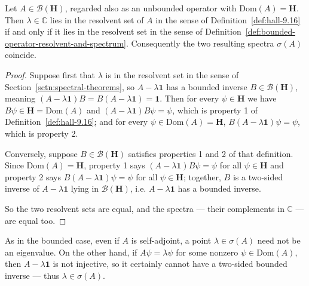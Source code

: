 \begin{lemma}
    \label{lmm:spectrum-notions-agree}
    \leanok
    Let $A \in \mathcal{B}(\mathbf{H})$, regarded also as an unbounded operator with $\text{Dom}(A) = \mathbf{H}$. Then $\lambda \in \mathbb{C}$ lies in the resolvent set of $A$ in the sense of Definition~\ref{def:hall-9.16} if and only if it lies in the resolvent set in the sense of Definition~\ref{def:bounded-operator-resolvent-and-spectrum}. Consequently the two resulting spectra $\sigma(A)$ coincide.
\end{lemma}
\begin{proof}
    \leanok
Suppose first that $\lambda$ is in the resolvent set in the sense of Section~\ref{sctn:spectral-theorems}, so $A - \lambda\mathbf{1}$ has a bounded inverse $B \in \mathcal{B}(\mathbf{H})$, meaning $(A-\lambda\mathbf{1})B = B(A-\lambda\mathbf{1}) = \mathbf{1}$. Then for every $\psi \in \mathbf{H}$ we have $B\psi \in \mathbf{H} = \text{Dom}(A)$ and $(A-\lambda\mathbf{1})B\psi = \psi$, which is property 1 of Definition~\ref{def:hall-9.16}; and for every $\psi \in \text{Dom}(A) = \mathbf{H}$, $B(A-\lambda\mathbf{1})\psi = \psi$, which is property 2.

Conversely, suppose $B \in \mathcal{B}(\mathbf{H})$ satisfies properties 1 and 2 of that definition. Since $\text{Dom}(A) = \mathbf{H}$, property 1 says $(A-\lambda\mathbf{1})B\psi = \psi$ for all $\psi \in \mathbf{H}$ and property 2 says $B(A-\lambda\mathbf{1})\psi = \psi$ for all $\psi \in \mathbf{H}$; together, $B$ is a two-sided inverse of $A - \lambda\mathbf{1}$ lying in $\mathcal{B}(\mathbf{H})$, i.e. $A - \lambda\mathbf{1}$ has a bounded inverse.

So the two resolvent sets are equal, and the spectra — their complements in $\mathbb{C}$ — are equal too.
\end{proof}

As in the bounded case, even if $A$ is self-adjoint, a point $\lambda \in \sigma(A)$ need not be an eigenvalue. On the other hand, if $A\psi = \lambda\psi$ for some nonzero $\psi \in \text{Dom}(A)$, then $A - \lambda\mathbf{1}$ is not injective, so it certainly cannot have a two-sided bounded inverse — thus $\lambda \in \sigma(A)$.


